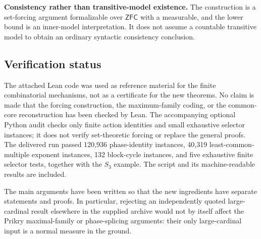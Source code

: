 \documentclass[11pt,letterpaper]{article}
\theoremstyle{definition}
\numberwithin{equation}{section}
\newcommand{\ZFC}{\mathsf{ZFC}}
\begin{document}
\textbf{Consistency rather than transitive-model existence.} The construction is a set-forcing argument formalizable over $\ZFC$ with a measurable, and the lower bound is an inner-model interpretation. It does not assume a countable transitive model to obtain an ordinary syntactic consistency conclusion.

\subsection{Verification status}

The attached Lean code was used as reference material for the finite combinatorial mechanisms, not as a certificate for the new theorems. No claim is made that the forcing construction, the maximum-family coding, or the common-core reconstruction has been checked by Lean. The accompanying optional Python audit checks only finite action identities and small exhaustive selector instances; it does not verify set-theoretic forcing or replace the general proofs. The delivered run passed 120,936 phase-identity instances, 40,319 least-common-multiple exponent instances, 132 block-cycle instances, and five exhaustive finite selector tests, together with the $S_3$ example. The script and its machine-readable results are included.

The main arguments have been written so that the new ingredients have separate statements and proofs. In particular, rejecting an independently quoted large-cardinal result elsewhere in the supplied archive would not by itself affect the Prikry maximal-family or phase-splicing arguments: their only large-cardinal input is a normal measure in the ground.
\end{document}
